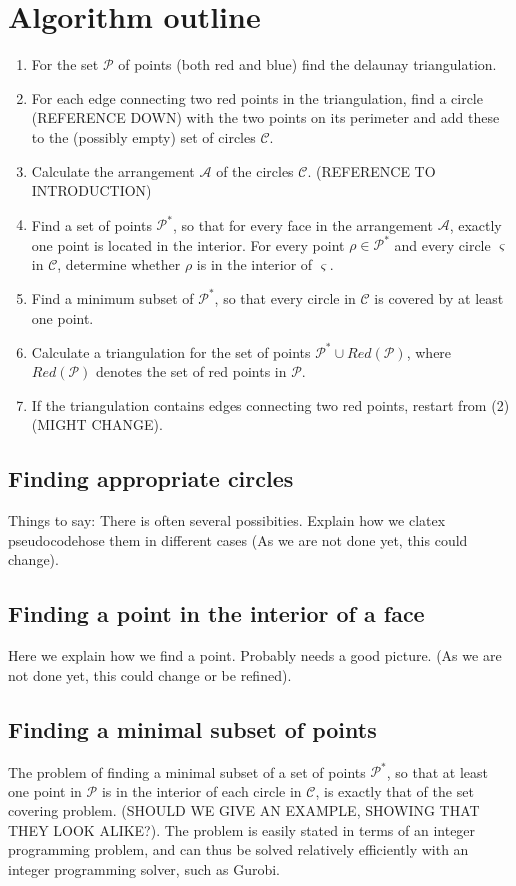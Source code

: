 \documentclass[a4paper,12pt]{article}
\begin{document}
\section{Algorithm outline}
\begin{enumerate}
\item
For the set $\mathcal P$ of points (both red and blue) find the delaunay triangulation.
\item
For each edge connecting two red points in the triangulation, find a circle (REFERENCE DOWN) with the two points on its perimeter and add these to the (possibly empty) set of circles $\mathcal C$.
\item
Calculate the arrangement $\mathcal A$ of the circles $\mathcal C$. (REFERENCE TO INTRODUCTION)
\item
Find a set of points $\mathcal P^*$, so that for every face in the arrangement $\mathcal A$, exactly one point is located in the interior. For every point $\rho  \in \mathcal P^*$ and every circle $\varsigma$ in $\mathcal C$, determine whether $\rho$ is in the interior of $\varsigma$.
\item
Find a minimum subset of $\mathcal P^*$, so that every circle in $\mathcal C$ is covered by at least one point.
\item
Calculate a triangulation for the set of points $\mathcal P^* \cup Red(\mathcal P )$, where  $Red(\mathcal P )$ denotes the set of red points in $\mathcal P$.
\item
If the triangulation contains edges connecting two red points, restart from (2) (MIGHT CHANGE).
\end{enumerate}

\subsection{Finding appropriate circles}
Things to say: There is often several possibities. Explain how we clatex pseudocodehose them in different cases (As we are not done yet, this could change).

\subsection{Finding a point in the interior of a face}
Here we explain how we find a point. Probably needs a good picture. (As we are not done yet, this could change or be refined).

\subsection{Finding a minimal subset of points}
The problem of finding a minimal subset of a set of points $\mathcal P^*$, so that at least one point in $\mathcal P$ is in the interior of each circle in $\mathcal C$, is exactly that of the set covering problem. (SHOULD WE GIVE AN EXAMPLE, SHOWING THAT THEY LOOK ALIKE?). The problem is easily stated in terms of an integer programming problem, and can thus be solved relatively efficiently with an integer programming solver, such as Gurobi.
\end{document}
